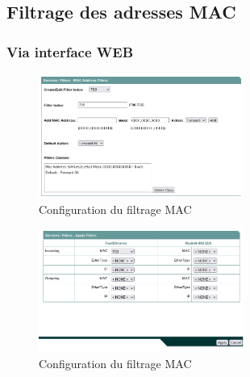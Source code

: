 \documentclass[12pt, a4paper]{article}
\begin{document}
    \subsection{Filtrage des adresses MAC}
        \subsubsection{Via interface WEB}
        \begin{figure}[H]
            \centering
            \includegraphics[width=0.6\textwidth]{img/filtrage-mac.png}
            \caption{Configuration du filtrage MAC}
            \label{fig:mac}
        \end{figure}
        \begin{figure}[H]
            \centering
            \includegraphics[width=0.6\textwidth]{img/filtrage-mac2.png}
            \caption{Configuration du filtrage MAC}
            \label{fig:mac2}
        \end{figure}
\end{document}
